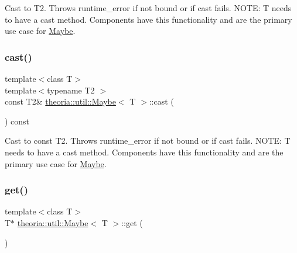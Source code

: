 Cast to T2. Throws runtime\+\_\+error if not bound or if cast fails. N\+O\+TE\+: T needs to have a cast method. Components have this functionality and are the primary use case for \hyperlink{classtheoria_1_1util_1_1Maybe}{Maybe}. \mbox{\label{classtheoria_1_1util_1_1Maybe_ace81aebc19ece88322c2d0966536ed3c}} 
\subsubsection{\texorpdfstring{cast()}{cast()}\hspace{0.1cm}{\footnotesize\ttfamily [2/2]}}
{\footnotesize\ttfamily template$<$class T$>$ \\
template$<$typename T2 $>$ \\
const T2\& \hyperlink{classtheoria_1_1util_1_1Maybe}{theoria\+::util\+::\+Maybe}$<$ T $>$\+::cast (\begin{DoxyParamCaption}{ }\end{DoxyParamCaption}) const\hspace{0.3cm}{\ttfamily [inline]}}

Cast to const T2. Throws runtime\+\_\+error if not bound or if cast fails. N\+O\+TE\+: T needs to have a cast method. Components have this functionality and are the primary use case for \hyperlink{classtheoria_1_1util_1_1Maybe}{Maybe}. \mbox{\label{classtheoria_1_1util_1_1Maybe_aeee7f778958a3c253f7ba57d190e55fe}} 
\subsubsection{\texorpdfstring{get()}{get()}\hspace{0.1cm}{\footnotesize\ttfamily [1/2]}}
{\footnotesize\ttfamily template$<$class T$>$ \\
T$\ast$ \hyperlink{classtheoria_1_1util_1_1Maybe}{theoria\+::util\+::\+Maybe}$<$ T $>$\+::get (\begin{DoxyParamCaption}{ }\end{DoxyParamCaption})\hspace{0.3cm}{\ttfamily [inline]}}

